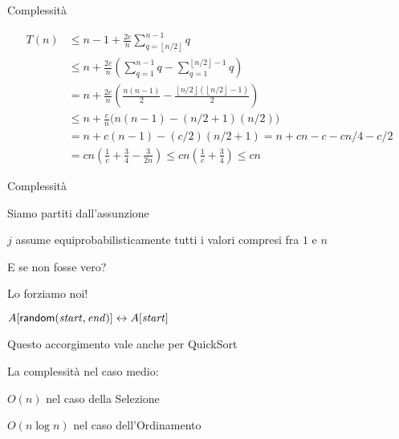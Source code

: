 \begin{frame}{Complessità}

\begin{align*}
T\left(n\right) &\le n - 1 + \frac{2c}{n} \sum_{q=\left\lfloor n/2\right\rfloor}^{n-1}q \\
&\le n + \frac{2c}{n}\left(\sum_{q=1}^{n-1}q - \sum_{q=1}^{\left\lfloor n/2\right\rfloor-1}q\right)\\
&= n + \frac{2c}{n}\left(\frac{n\left(n- 1\right)}{2} - \frac{\left\lfloor n/2\right\rfloor\left(\left\lfloor n/2\right\rfloor - 1\right)}{2}\right)\\
&\le n + \frac{c}{n}\big(n\left(n- 1\right) - \left(n/2+1\right)\left(n/2\right)\big)\\
&= n + c\left(n - 1\right) - \left(c/2\right)\left(n/2+ 1\right) = n + cn - c - cn/4 - c/2\\
&= cn \left( \frac{1}{c}+ \frac{3}{4} - \frac{3}{2n}\right) \leq cn \left( \frac{1}{c}+ \frac{3}{4}\right) \leq cn
\end{align*}


\end{frame}

\begin{frame}{Complessità}
   
\BIL
\item  Siamo partiti dall’assunzione 
  \BI
  \item $j$ assume equiprobabilisticamente tutti i valori compresi fra $1$ e $n$
  \EI
\item E se non fosse vero?
\item Lo forziamo noi!
  \BI
  \item  $A[\textsf{random}(\mathit{start}, \mathit{end})] \leftrightarrow A[\mathit{start}]$
  \EI
\item Questo accorgimento vale anche per QuickSort    
\item La complessità nel caso medio:
  \BI
  \item $O(n)$ nel caso della Selezione
  \item $O(n \log n)$ nel caso dell'Ordinamento
  \EI
\EIL

\end{frame}

\section{}


